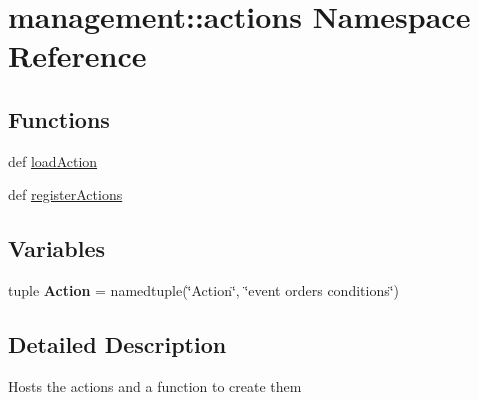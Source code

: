 \hypertarget{namespacemanagement_1_1actions}{\section{management\-:\-:actions \-Namespace \-Reference}
\label{namespacemanagement_1_1actions}
}
\subsection*{\-Functions}
\begin{DoxyCompactItemize}
\item 
def \hyperlink{namespacemanagement_1_1actions_a4dd605a79ffe46f86791f6965c367a7f}{load\-Action}
\item 
def \hyperlink{namespacemanagement_1_1actions_aa633b4b9442a157cff52e31bd306ed6d}{register\-Actions}
\end{DoxyCompactItemize}
\subsection*{\-Variables}
\begin{DoxyCompactItemize}
\item 
\hypertarget{namespacemanagement_1_1actions_a0b03b31005f4fcabde1eafa4845a41be}{tuple {\bfseries \-Action} = namedtuple(\char`\"{}\-Action\char`\"{}, \char`\"{}event orders conditions\char`\"{})}\label{namespacemanagement_1_1actions_a0b03b31005f4fcabde1eafa4845a41be}

\end{DoxyCompactItemize}


\subsection{\-Detailed \-Description}
\begin{DoxyVerb}Hosts the actions and a function to create them \end{DoxyVerb}
 

